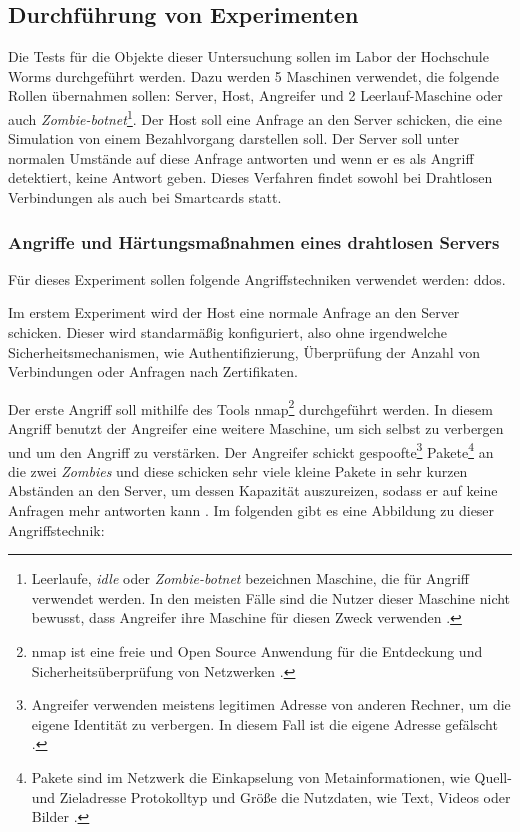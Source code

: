 \subsection{Durchführung von Experimenten}

Die Tests für die Objekte dieser Untersuchung sollen im Labor der Hochschule Worms durchgeführt werden. Dazu werden 5 
Maschinen verwendet, die folgende Rollen übernahmen sollen: Server, Host, Angreifer und 2 Leerlauf-Maschine oder auch
\textit{Zombie-botnet}\footnote{Leerlaufe, \textit{idle} oder \textit{Zombie-botnet} bezeichnen Maschine, die für Angriff
verwendet werden. In den meisten Fälle sind die Nutzer dieser Maschine nicht bewusst, dass Angreifer ihre Maschine für
diesen Zweck verwenden \cite{refart:XGDD}.}. Der Host soll eine Anfrage an den Server schicken, die eine Simulation
von einem Bezahlvorgang darstellen soll. Der Server soll unter normalen Umstände auf diese Anfrage antworten und wenn er es 
als Angriff detektiert, keine Antwort geben. Dieses Verfahren findet sowohl bei Drahtlosen Verbindungen als auch bei Smartcards statt.


\subsubsection{Angriffe und Härtungsmaßnahmen eines drahtlosen Servers}
Für dieses Experiment sollen folgende Angriffstechniken verwendet werden: \acrfull{ddos}.

Im erstem Experiment wird der Host eine normale Anfrage an den Server schicken. Dieser wird standarmäßig konfiguriert,
also ohne irgendwelche Sicherheitsmechanismen, wie Authentifizierung, Überprüfung der Anzahl von Verbindungen oder Anfragen
nach Zertifikaten.

Der erste Angriff soll mithilfe des Tools \acrfull{nmap}\footnote{\acrshort{nmap} ist eine freie und Open Source Anwendung
für die Entdeckung und Sicherheitsüberprüfung von Netzwerken \cite{refst:nmap}.} durchgeführt werden. In diesem Angriff 
benutzt der Angreifer eine weitere Maschine, um sich selbst zu verbergen und um den Angriff zu verstärken. Der Angreifer
schickt gespoofte\footnote{Angreifer verwenden meistens legitimen Adresse von anderen Rechner, um die eigene Identität
zu verbergen. In diesem Fall ist die eigene Adresse gefälscht \cite{refst:IPIO}.} Pakete\footnote{Pakete sind im Netzwerk
die Einkapselung von Metainformationen, wie Quell-und Zieladresse Protokolltyp und Größe die Nutzdaten, wie Text, 
Videos oder Bilder \cite{refbook:SWIS}.} an die zwei \textit{Zombies} und diese schicken sehr viele kleine Pakete in sehr
kurzen Abständen an den Server, um dessen Kapazität auszureizen, sodass er auf keine Anfragen mehr antworten kann 
\cite{refip:KSDD}. Im folgenden gibt es eine Abbildung zu dieser Angriffstechnik:

